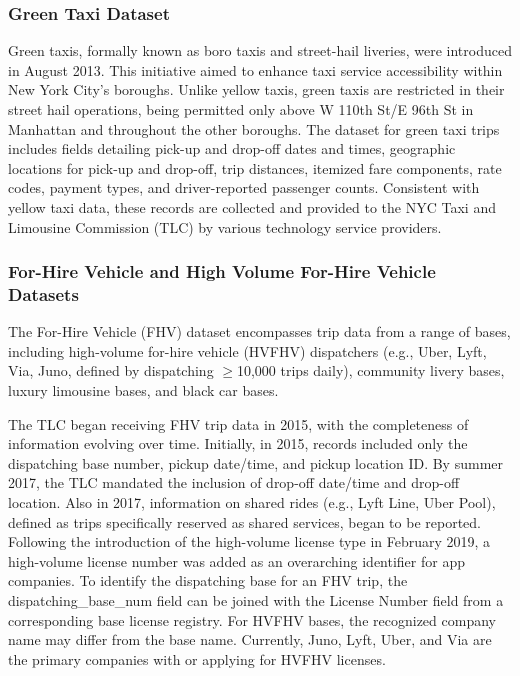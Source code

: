 \documentclass[conference]{IEEEtran}
\begin{document}
\subsubsection*{Green Taxi Dataset}
Green taxis, formally known as boro taxis and street-hail liveries, were introduced in August 2013. This initiative
aimed to enhance taxi service accessibility within New York City's boroughs. Unlike yellow taxis, green taxis are
restricted in their street hail operations, being permitted only above W 110th St/E 96th St in Manhattan and throughout
the other boroughs.
The dataset for green taxi trips includes fields detailing pick-up and drop-off dates and times, geographic locations
for pick-up and drop-off, trip distances, itemized fare components, rate codes, payment types, and driver-reported
passenger counts. Consistent with yellow taxi data, these records are collected and provided to the NYC Taxi and
Limousine Commission (TLC) by various technology service providers.

\subsubsection*{For-Hire Vehicle and High Volume For-Hire Vehicle Datasets}
The For-Hire Vehicle (FHV) dataset encompasses trip data from a range of bases, including high-volume for-hire vehicle
(HVFHV) dispatchers (e.g., Uber, Lyft, Via, Juno, defined by dispatching $\ge$10,000 trips daily), community livery
bases, luxury limousine bases, and black car bases.

The TLC began receiving FHV trip data in 2015, with the completeness of information evolving over time. Initially,
in 2015, records included only the dispatching base number, pickup date/time, and pickup location ID. By summer 2017,
the TLC mandated the inclusion of drop-off date/time and drop-off location. Also in 2017, information on shared rides
(e.g., Lyft Line, Uber Pool), defined as trips specifically reserved as shared services, began to be reported. Following
the introduction of the high-volume license type in February 2019, a high-volume license number was added as an
overarching identifier for app companies.
To identify the dispatching base for an FHV trip, the dispatching\_base\_num field can be joined with the License Number
field from a corresponding base license registry. For HVFHV bases, the recognized company name may differ from the base
name. Currently, Juno, Lyft, Uber, and Via are the primary companies with or applying for HVFHV licenses.
\end{document}
